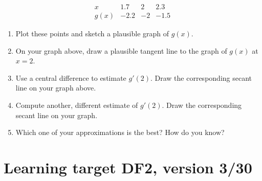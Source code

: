 \[
\begin{array}{c||r|r|r}
      x  &  1.7 &  2   &  2.3 \\\hline
    g(x) & -2.2 & -2   & -1.5
\end{array}
\]
\begin{enumerate}[leftmargin=0pt]

\item Plot these points and sketch a plausible graph of $g(x)$.


\item On your graph above, draw a plausible tangent line to the graph of $g(x)$ at $x=2$.

\item Use a central difference to estimate $g'(2)$. Draw the corresponding secant line on your graph above.

\vfill

\item Compute another, different estimate of $g'(2)$. Draw the corresponding secant line on your graph.

\vfill

\item Which one of your approximations is the best? How do you know?

\vspace{1cm}

\end{enumerate}

\pagebreak

\section{Learning target DF2, version 3/30}

